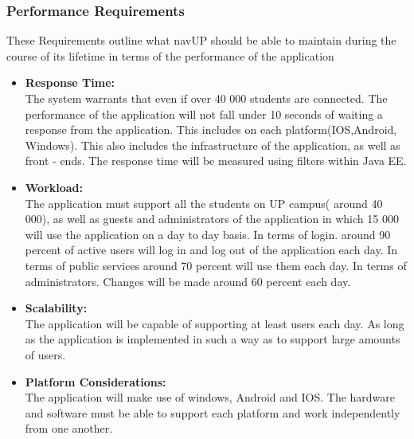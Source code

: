 \documentclass{article}
\begin{document}
 	\subsubsection{Performance Requirements}
 	These Requirements outline what navUP should be able to maintain during the course of its lifetime in terms of the performance of the application
 	\begin{itemize}
 	\item \textbf{Response Time:}
 \\	The system warrants that even if over 40 000 students are connected. The performance of the application will not fall under 10 seconds of waiting a response from the application. This includes on each platform(IOS,Android, Windows). This also includes the infrastructure of the application, as well as front - ends. The response time will be measured using filters within Java EE. 
 	
 	\item \textbf{Workload:}
 	\\The application must support all the students on UP campus( around 40 000), as well as guests and administrators of the application in which 15 000 will use the application on a day to day basis.
 	In terms of login. around 90 percent of active users will log in and log out of the application each day. In terms of public services around 70 percent will use them each day. In terms of administrators. Changes will be made around 60 percent each day.
 	\item \textbf{Scalability:}
 	\\The application will be capable of supporting at least users each day. As long as the application is implemented in such a way as to support large amounts of users.
 	
 	\item \textbf{Platform Considerations:}
 	\\The application will make use of windows, Android and IOS. The hardware and software must be able to support each platform and work independently from one another.
 \end{itemize}
 	
\end{document}
